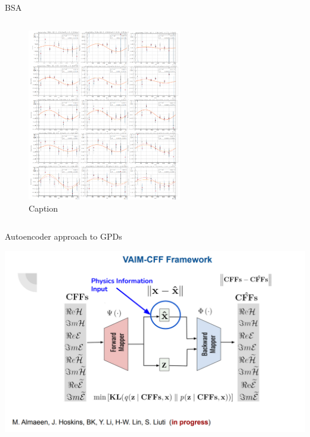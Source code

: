 \documentclass[aspectratio=169]{beamer}
\begin{document}
\begin{frame}{BSA}

        
        \begin{columns}
                                
    
                \begin{figure}
                    \centering
                    \includegraphics[width=0.6\textwidth]{defense/BSA.png}
                    \caption{Caption}
                    \label{fig:enter-label}
                \end{figure}

        \end{columns}
\end{frame} 




\begin{frame}{Autoencoder approach to GPDs}

  \includegraphics[scale=0.52832]{janres/vain1.png}
\end{frame}
\end{document}

